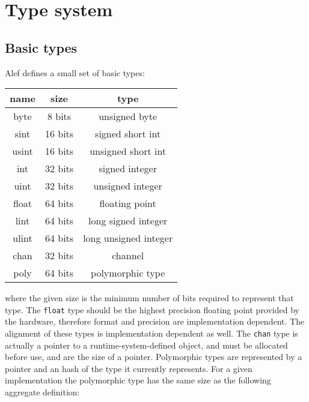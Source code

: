 
\hypertarget{type-system}{%
\chapter{Type system}\label{type-system}}

\hypertarget{basic-types}{%
\section{Basic types}\label{basic-types}}

Alef defines a small set of basic types:

\begin{table}[h]
  \centering
\begin{tabular}{|c|c|c|}
\hline
name  & size    & type                  \\ \hline
byte  & 8 bits  & unsigned byte         \\ \hline
sint  & 16 bits & signed short int      \\ \hline
usint & 16 bits & unsigned short int    \\ \hline
int   & 32 bits & signed integer        \\ \hline
uint  & 32 bits & unsigned integer      \\ \hline
float & 64 bits & floating point        \\ \hline
lint  & 64 bits & long signed integer   \\ \hline
ulint & 64 bits & long unsigned integer \\ \hline
chan  & 32 bits & channel               \\ \hline
poly  & 64 bits & polymorphic type      \\ \hline
\end{tabular}
\end{table}

where the given size is the minimum number of bits required to represent
that type. The \passthrough{\lstinline!float!} type should be the
highest precision floating point provided by the hardware, therefore
format and precision are implementation dependent. The alignment of
these types is implementation dependent as well. The
\passthrough{\lstinline!chan!} type is actually a pointer to a
runtime-system-defined object, and must be allocated before use, and are
the size of a pointer. Polymorphic types are represented by a pointer
and an hash of the type it currently represents. For a given
implementation the polymorphic type has the same size as the following
aggregate definition:

